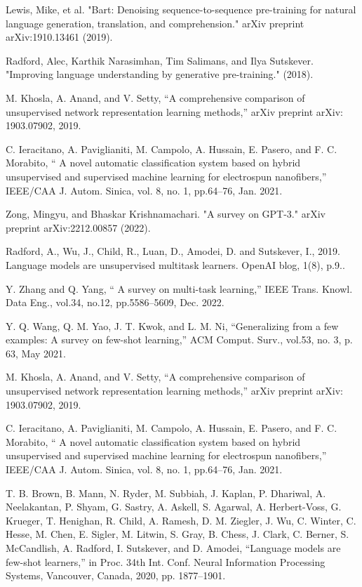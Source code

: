 \documentclass[conference]{IEEEtran}
\begin{document}
\begin{thebibliography}{00}
 Lewis, Mike, et al. "Bart: Denoising sequence-to-sequence pre-training for natural language generation, translation, and comprehension." arXiv preprint arXiv:1910.13461 (2019).

 Radford, Alec, Karthik Narasimhan, Tim Salimans, and Ilya Sutskever. "Improving language understanding by generative pre-training." (2018).

 M. Khosla, A. Anand, and V. Setty, “A comprehensive comparison of unsupervised network representation learning methods,” arXiv preprint arXiv: 1903.07902, 2019.

 C. Ieracitano, A. Paviglianiti, M. Campolo, A. Hussain, E. Pasero, and F. C. Morabito, “ A novel automatic classification system based on hybrid unsupervised and supervised machine learning for electrospun nanofibers,” IEEE/CAA J. Autom. Sinica, vol. 8, no. 1, pp.64–76, Jan. 2021.


 Zong, Mingyu, and Bhaskar Krishnamachari. "A survey on GPT-3." arXiv preprint arXiv:2212.00857 (2022).

 Radford, A., Wu, J., Child, R., Luan, D., Amodei, D. and Sutskever, I., 2019. Language models are unsupervised multitask learners. OpenAI blog, 1(8), p.9..

 Y. Zhang and Q. Yang, “ A survey on multi-task learning,” IEEE Trans. Knowl. Data Eng., vol.34, no.12, pp.5586–5609, Dec. 2022.

 Y. Q. Wang, Q. M. Yao, J. T. Kwok, and L. M. Ni, “Generalizing from a few examples: A survey on few-shot learning,” ACM Comput. Surv., vol.53, no. 3, p. 63, May 2021.

 M. Khosla, A. Anand, and V. Setty, “A comprehensive comparison of unsupervised network representation learning methods,” arXiv preprint arXiv: 1903.07902, 2019.

 C. Ieracitano, A. Paviglianiti, M. Campolo, A. Hussain, E. Pasero, and F. C. Morabito, “ A novel automatic classification system based on hybrid unsupervised and supervised machine learning for electrospun nanofibers,” IEEE/CAA J. Autom. Sinica, vol. 8, no. 1, pp.64–76, Jan. 2021.


 T. B. Brown, B. Mann, N. Ryder, M. Subbiah, J. Kaplan, P. Dhariwal, A. Neelakantan, P. Shyam, G. Sastry, A. Askell, S. Agarwal, A. Herbert-Voss, G. Krueger, T. Henighan, R. Child, A. Ramesh, D. M. Ziegler, J. Wu, C. Winter, C. Hesse, M. Chen, E. Sigler, M. Litwin, S. Gray, B. Chess, J. Clark, C. Berner, S. McCandlish, A. Radford, I. Sutskever, and D. Amodei, “Language models are few-shot learners,” in Proc. 34th Int. Conf. Neural Information Processing Systems, Vancouver, Canada, 2020, pp. 1877–1901.



\end{thebibliography}
\end{document}
